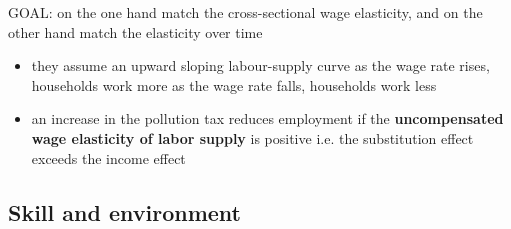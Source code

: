 \ar GOAL: on the one hand match the cross-sectional wage elasticity, and on the other hand match the elasticity over time
\cite{LansBovenberg1994EnvironmentalTaxation}
\begin{itemize}
	\item they assume an upward sloping labour-supply curve \ar as the wage rate rises, households work more \ar as the wage rate falls, households work less
	\item an increase in the pollution tax reduces employment if the \textbf{uncompensated wage elasticity of labor supply} is positive \ar i.e. the substitution effect exceeds the income effect
\end{itemize}

\subsection{Skill and environment}
